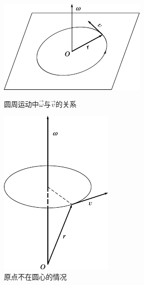 \begin{figure}[!h]
  \small
  \begin{minipage}[b]{15em}
    \centering
    \includegraphics{figure/fig01.20}
    \vspace{4em}
    \caption{圆周运动中$  \vec{\omega}$与$\vec{v}$的关系}
    \label{fig:01.20}
  \end{minipage}
  \hfill
  \begin{minipage}[b]{13em}
    \centering
    \includegraphics{figure/fig01.21}
    \vspace{1em}
    \caption{原点不在圆心的情况}
    \label{fig:01.21}
  \end{minipage}
\end{figure}

